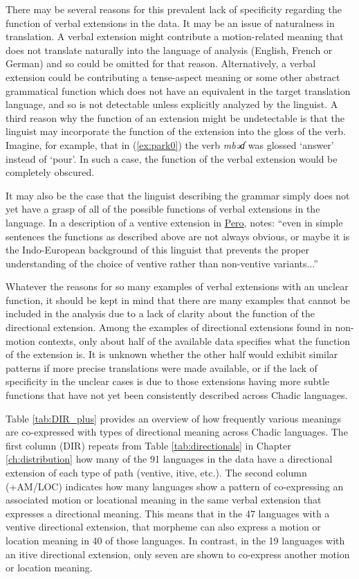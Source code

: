 There may be several reasons for this prevalent lack of specificity regarding the function of verbal extensions in the data. It may be an issue of naturalness in translation. A verbal extension might contribute a motion-related meaning that does not translate naturally into the language of analysis (English, French or German) and so could be omitted for that reason. Alternatively, a verbal extension could be contributing a tense-aspect meaning or some other abstract grammatical function which does not have an equivalent in the target translation language, and so is not detectable unless explicitly analyzed by the linguist. A third reason why the function of an extension might be undetectable is that the linguist may incorporate the function of the extension into the gloss of the verb. Imagine, for example, that in (\ref{ex:park0}) the verb \textit{mbəɗ} was glossed `answer' instead of `pour'. In such a case, the function of the verbal extension would be completely obscured. 

It may also be the case that the linguist describing the grammar simply does not yet have a grasp of all of the possible functions of verbal extensions in the language. In a description of a ventive extension in \hyperref[pero]{Pero}, \citet[97]{frajzyngierGrammarPero1989} notes: ``even in simple sentences the functions as described above are not always obvious, or maybe it is the Indo-European background of this linguist that prevents the proper understanding of the choice of ventive rather than non-ventive variants...''

Whatever the reasons for so many examples of verbal extensions with an unclear function, it should be kept in mind that there are many examples that cannot be included in the analysis due to a lack of clarity about the function of the directional extension. Among the examples of directional extensions found in non-motion contexts, only about half of the available data specifies what the function of the extension is. It is unknown whether the other half would exhibit similar patterns if more precise translations were made available, or if the lack of specificity in the unclear cases is due to those extensions having more subtle functions that have not yet been consistently described across Chadic languages. 

Table \ref{tab:DIR_plus} provides an overview of how frequently various meanings are co-expressed with types of directional meaning across Chadic languages. The first column (DIR) repeats from Table \ref{tab:directionals} in Chapter \ref{ch:distribution} how many of the 91 languages in the data have a directional extension of each type of path (ventive, itive, etc.). The second column (+AM/LOC) indicates how many languages show a pattern of co-expressing an associated motion or locational meaning in the same verbal extension that expresses a directional meaning. This means that in the 47 languages with a ventive directional extension, that morpheme can also express a motion or location meaning in 40 of those languages. In contrast, in the 19 languages with an itive directional extension, only seven are shown to co-express another motion or location meaning. 

